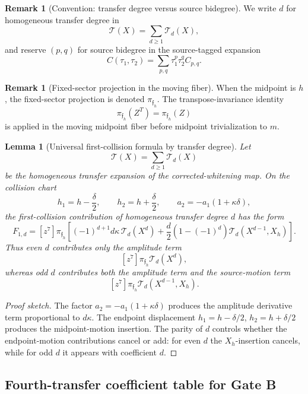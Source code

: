\documentclass[11pt,a4paper]{amsart}
\theoremstyle{plain}
\newtheorem{lemma}[theorem]{Lemma}
\theoremstyle{definition}
\newtheorem{remark}[theorem]{Remark}
\begin{document}
\begin{remark}[Convention: transfer degree versus source bidegree]
\label{conv:transfer-degree-versus-source-bidegree}
We write \(d\) for homogeneous transfer degree in
\[
\mathcal T(X)=\sum_{d\ge1}\mathcal T_d(X),
\]
and reserve \((p,q)\) for source bidegree in the source-tagged expansion
\[
C(\tau_1,\tau_2)=\sum_{p,q}\tau_1^p\tau_2^qC_{p,q}.
\]
\end{remark}

\begin{remark}[Fixed-sector projection in the moving fiber]
\label{rem:fixed-sector-projection-moving-fiber}
When the midpoint is \(h\), the fixed-sector projection is denoted
\(\pi_{\mathfrak f_h}\).  The transpose-invariance identity
\[
\pi_{\mathfrak f_h}(Z^T)=\pi_{\mathfrak f_h}(Z)
\]
is applied in the moving midpoint fiber before midpoint trivialization to
\(m\).
\end{remark}

\begin{lemma}[Universal first-collision formula by transfer degree]
\label{lem:universal-first-collision-formula-transfer-degree}
Let
\[
\mathcal T(X)=\sum_{d\ge1}\mathcal T_d(X)
\]
be the homogeneous transfer expansion of the corrected-whitening map.  On
the collision chart
\[
h_1=h-\frac{\delta}{2},\qquad
h_2=h+\frac{\delta}{2},\qquad
a_2=-a_1(1+\kappa\delta),
\]
the first-collision contribution of homogeneous transfer degree \(d\) has
the form
\[
\boxed{
F_{1,d}
=
[z^7]\pi_{\mathfrak f_h}
\left[
(-1)^{d+1}d\kappa\,\mathcal T_d(X^d)
+
\frac d2(1-(-1)^d)\mathcal T_d(X^{d-1},X_h)
\right].
}
\]
Thus even \(d\) contributes only the amplitude term
\[
[z^7]\pi_{\mathfrak f_h}\mathcal T_d(X^d),
\]
whereas odd \(d\) contributes both the amplitude term and the
source-motion term
\[
[z^7]\pi_{\mathfrak f_h}\mathcal T_d(X^{d-1},X_h).
\]
\end{lemma}

\begin{proof}[Proof sketch]
The factor \(a_2=-a_1(1+\kappa\delta)\) produces the amplitude derivative
term proportional to \(d\kappa\).  The endpoint displacement
\(h_1=h-\delta/2\), \(h_2=h+\delta/2\) produces the midpoint-motion
insertion.  The parity of \(d\) controls whether the endpoint-motion
contributions cancel or add: for even \(d\) the \(X_h\)-insertion cancels,
while for odd \(d\) it appears with coefficient \(d\).
\end{proof}

\subsection{Fourth-transfer coefficient table for Gate B}
\label{subsec:fourth-transfer-coefficient-table-gate-b}
\end{document}

